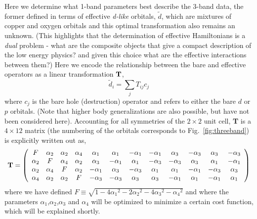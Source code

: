 Here we determine what 1-band parameters best describe the 3-band data, the former defined 
in terms of effective \textit{d-like} orbitals, $\tilde{d}$, which are mixtures of copper and oxygen orbitals and this optimal transformation also remains an unknown. (This highlights that the determination of effective Hamiltonians is a \emph{dual} problem - 
what are the composite objects that give a compact description of the low energy physics? and given this choice what 
are the effective interactions between them?) Here we encode the relationship between the 
bare and effective operators as a linear transformation ${\bf T}$, 
\begin{equation}
	\tilde{d}_i = \sum_{j} T_{ij} c_j
\end{equation}
where $c_j$ is the bare hole (destruction) operator and refers to either the bare $d$ or $p$ orbitals. 
(Note that higher body generalizations are also possible, but have not been considered here). 
Accounting for all symmetries of the $2\times2$ unit cell, {\bf T} is a $4 \times 12 $ matrix (the numbering of the orbitals 
corresponds to Fig.~\ref{fig:threeband}) is explicitly written out as, 
\begin{eqnarray}
{\bf T} = 
\left(
\begin{array}{cccccccccccc}
F        & \alpha_2 &        \alpha_2 &  \alpha_4 & \alpha_1 & \alpha_1 & -\alpha_1 & -\alpha_1 & \alpha_3 & -\alpha_3 & \alpha_3 & -\alpha_3 \\
\alpha_2 &  F       &        \alpha_4 &  \alpha_2 & \alpha_3 & -\alpha_1 & \alpha_1 & -\alpha_3 & -\alpha_3 & \alpha_3 & \alpha_1 & -\alpha_1 \\
\alpha_2 & \alpha_4 & F               &  \alpha_2 & -\alpha_1 & \alpha_3 & -\alpha_3 & \alpha_1 & \alpha_1 & -\alpha_1 & -\alpha_3 & \alpha_3 \\
\alpha_4 & \alpha_2 & \alpha_2        &   F       & -\alpha_3 & -\alpha_3 & \alpha_3 & \alpha_3 & -\alpha_1 & \alpha_1 & -\alpha_1 & \alpha_1 \\
\end{array}
\right)
\end{eqnarray}
where we have defined $F \equiv \sqrt{1-4{\alpha_1}^2 - 2{\alpha_2}^2 - 4 {\alpha_3}^2 -{\alpha_4}^2}$ and 
where the parameters $\alpha_1$,$\alpha_2$,$\alpha_3$ and $\alpha_4$ will be optimized to minimize a 
certain cost function, which will be explained shortly. 

